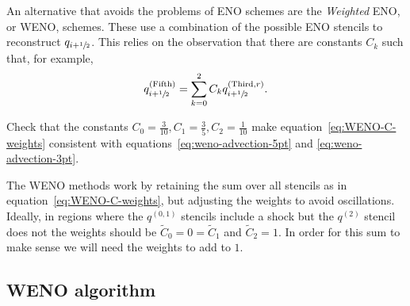 An alternative that avoids the problems of ENO schemes are the \emph{Weighted}
ENO, or WENO, schemes. These use a combination of the possible ENO stencils to
reconstruct $q_{i+{\sfrac{1}{2}}}$. This relies on the observation that there are
constants $C_k$ such that, for example,
\begin{equation}
  \label{eq:WENO-C-weights}
  q^{(\text{Fifth})}_{i+{\sfrac{1}{2}}} = \sum_{k=0}^{2} C_k q^{(\text{Third}, r)}_{i+{\sfrac{1}{2}}}.
\end{equation}

\begin{exercise}
{Check that the constants $C_0 = \tfrac{3}{10}, C_1 = \tfrac{3}{5}, C_2 =
\tfrac{1}{10}$ make equation~\eqref{eq:WENO-C-weights} consistent with
equations~\eqref{eq:weno-advection-5pt} and \eqref{eq:weno-advection-3pt}.}
\end{exercise}

The WENO methods work by retaining the sum over all stencils as in
equation~\eqref{eq:WENO-C-weights}, but adjusting the weights to avoid
oscillations. Ideally, in regions where the $q^{(0,1)}$ stencils include a
shock but the $q^{(2)}$ stencil does not the weights should be $\tilde{C}_0 = 0
= \tilde{C}_1$ and $\tilde{C}_2 = 1$. In order for this sum to make sense we
will need the weights to add to $1$.

\subsection{WENO algorithm}
\label{sec:WENO-algorithm}

